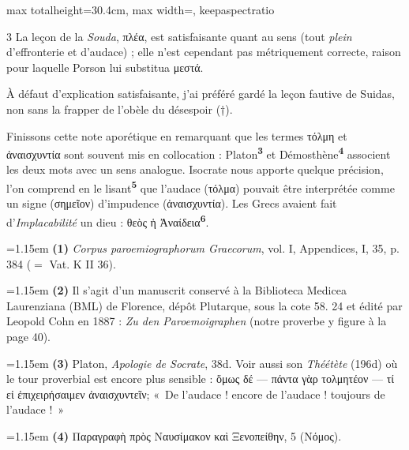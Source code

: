 \documentclass[11pt,twoside]{book}
\newcommand{\italique}[1]{\textit{#1}}
\newcommand{\marqueur}[1]{\textsuperscript{\color{rubricRed}\textbf{#1}}}
\begin{document}
\begin{adjustbox}{max totalheight=30.4cm, max width=\textwidth, keepaspectratio}
\begin{minipage}{\textwidth}
{\begin{multicols}{3}
\noindent La leçon de la \italique{Souda}, πλέα, est satisfaisante quant au sens (tout \italique{plein} d'effronterie et d'audace) ; elle n'est cependant pas métriquement correcte, raison pour laquelle Porson lui substitua μεστά.
\par\vspace{1.5pt}
\noindent À défaut d'explication satisfaisante, j'ai préféré gardé la leçon fautive de Suidas, non sans la frapper de l'obèle du désespoir (†).
\par\vspace{1.5pt}
\noindent Finissons cette note aporétique en remarquant que les termes τόλμη et ἀναισχυντία sont souvent mis en collocation : Platon\marqueur{3} et Démosthène\marqueur{4} associent les deux mots avec un sens analogue. Isocrate nous apporte quelque précision, l'on comprend en le lisant\marqueur{5} que l'audace (τόλμα) pouvait être interprétée comme un signe (σημεῖον) d'impudence (ἀναισχυντία). Les Grecs avaient fait d'\italique{Implacabilité} un dieu : θεὸς ἡ Ἀναίδεια\marqueur{6}.
\par\vspace{1.5pt}
\par\vspace{1.2pt}\par\nopagebreak\vspace{1pt}\noindent\hangindent=1.15em {\color{sepiaNote}\textbf{(1)}} \italique{Corpus paroemiographorum Graecorum}, vol. I, Appendices, I, 35, p. 384 ($=$ Vat. K II 36).
\par\vspace{1.5pt}
\noindent\hangindent=1.15em {\color{sepiaNote}\textbf{(2)}} Il s'agit d'un manuscrit conservé à la Biblioteca Medicea Laurenziana (BML) de Florence, dépôt Plutarque, sous la cote 58. 24  et édité par Leopold Cohn en 1887 : \italique{Zu den Paroemoigraphen} (notre proverbe y figure à la page 40).
\par\vspace{1.5pt}
\noindent\hangindent=1.15em {\color{sepiaNote}\textbf{(3)}} Platon, \italique{Apologie de Socrate}, 38d. Voir aussi son \italique{Théétète} (196d) où le tour proverbial est encore plus sensible : ὅμως δέ — πάντα γὰρ τολμητέον — τί εἰ ἐπιχειρήσαιμεν ἀναισχυντεῖν; «~De l'audace ! encore de l'audace ! toujours de l'audace !~»
\par\vspace{1.5pt}
\noindent\hangindent=1.15em {\color{sepiaNote}\textbf{(4)}} Παραγραφὴ πρὸς Ναυσίμακον καὶ Ξενοπείθην, 5 (Νόμος).

\end{multicols}}
\end{minipage}
\end{adjustbox}
\end{document}

